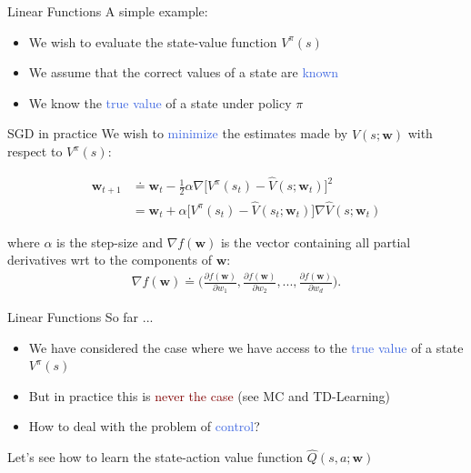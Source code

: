 \documentclass{beamer}
\begin{document}
\begin{frame}{Linear Functions}
	A simple example:
	\begin{itemize}
		\item We wish to evaluate the state-value function $V^\pi(s)$
		\item We assume that the correct values of a state are \textcolor{RoyalBlue}{known} 
		\item We know the \textcolor{RoyalBlue}{true value} of a state under policy $\pi$
	\end{itemize}

	\begin{block}{SGD in practice}
		We wish to \textcolor{RoyalBlue}{minimize} the estimates made by $\hat{V}(s;\mathbf{w})$ with respect to $V^{\pi}(s)$:
		
		\begin{align*}
			\mathbf{w}_{t+1} & \doteq \mathbf{w}_t - \frac{1}{2} \alpha\nabla\Big[V^{\pi}(s_t)-\hat{V}(s;\mathbf{w}_t)\Big]^{2} \\ 
					 & = \mathbf{w}_t +\alpha\Big[V^{\pi}(s_t)-\hat{V}(s_t;\mathbf{w}_t)\Big]\nabla \hat{V}(s;\mathbf{w}_t)
		\end{align*}

		where $\alpha$ is the step-size and $\nabla f(\mathbf{w})$ is the vector containing all partial derivatives wrt to the components of $\mathbf{w}$:
		\begin{align*}
			\nabla f(\mathbf{w}) \doteq \Big(\frac{\partial f(\mathbf{w})}{\partial w_1}, \frac{\partial f(\mathbf{w})}{\partial w_2}, ..., \frac{\partial f(\mathbf{w})}{\partial w_d}\Big).
		\end{align*}

	\end{block}
\end{frame}

\begin{frame}{Linear Functions}
	So far ...
	\begin{itemize}
		\item We have considered the case where we have access to the \textcolor{RoyalBlue}{true value} of a state $V^{\pi}(s)$
		\item But in practice this is \textcolor{Maroon}{never the case} (see MC and TD-Learning)
		\item How to deal with the problem of \textcolor{RoyalBlue}{control}?
	\end{itemize}

	\bigskip 

	Let's see how to learn the state-action value function $\hat{Q}(s,a;\mathbf{w})$

\end{frame}
\end{document}
